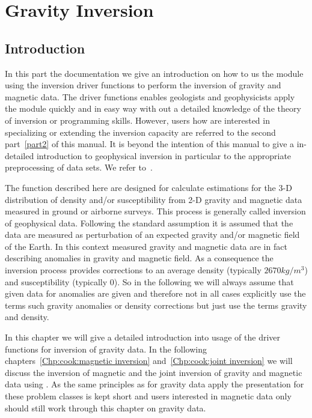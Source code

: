 \chapter{Gravity Inversion}\label{Chp:cook:gravity inversion}

\section{Introduction}

In this part the documentation we give an introduction on how to us the \downunder module using the 
inversion driver functions to perform the inversion of gravity and magnetic data. The driver functions 
enables geologists and geophysicists apply the \downunder module quickly and in easy way
with out a detailed knowledge of the theory of inversion or programming skills. However, users
how are interested in specializing or extending the inversion capacity are referred to the second part~\ref{part2}
of this manual. It is beyond the intention of this manual to give a in-detailed introduction to
geophysical inversion in particular to the appropriate preprocessing of data sets. We refer to~\cite{REF1, REF2, REF3}.


The \downunder function described here are designed for calculate estimations for the 
3-D distribution of density and/or susceptibility from 2-D gravity and magnetic data measured in ground 
or airborne surveys. This process is generally called inversion of geophysical data.
Following the standard assumption it is assumed that the 
data are measured as perturbation of an expected gravity and/or magnetic
field of the Earth. In this context measured gravity and magnetic data are in fact describing anomalies in 
gravity and magnetic field. As a consequence the inversion process 
provides corrections to an average density (typically $2670 kg/m^3$) and susceptibility (typically $0$). 
So in the following we will always assume that given data for anomalies are given and therefore
not in all cases explicitly use the terms such gravity anomalies or density corrections but just use the terms
gravity and density.

In this chapter we will give a detailed introduction into usage of the driver functions 
for inversion of gravity data. In the following chapters~\ref{Chp:cook:magnetic inversion} and~\ref{Chp:cook:joint inversion}
we will discuss the inversion of magnetic and the joint inversion of gravity and magnetic data using 
\downunder. As the same principles as for gravity data apply the presentation for these problem classes is kept short and 
users interested in magnetic data only should still work through this chapter on gravity data. 

